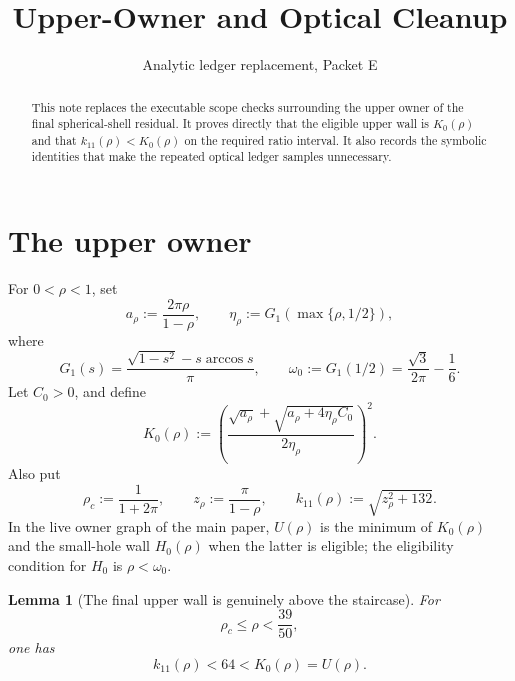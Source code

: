 \documentclass[11pt]{article}
\title{Upper-Owner and Optical Cleanup}
\author{}
\date{Analytic ledger replacement, Packet E}
\newtheorem{lemma}{Lemma}
\begin{document}
\maketitle

\begin{abstract}
This note replaces the executable scope checks surrounding the upper owner
of the final spherical-shell residual. It proves directly that the eligible
upper wall is \(K_0(\rho)\) and that
\(k_{11}(\rho)<K_0(\rho)\) on the required ratio interval. It also records
the symbolic identities that make the repeated optical ledger samples
unnecessary.
\end{abstract}

\section{The upper owner}

For \(0<\rho<1\), set
\[
 a_\rho:=\frac{2\pi\rho}{1-\rho},
 \qquad
 \eta_\rho:=G_1\!\left(\max\{\rho,1/2\}\right),
\]
where
\[
 G_1(s)=\frac{\sqrt{1-s^2}-s\arccos s}{\pi},
 \qquad
 \omega_0:=G_1(1/2)=\frac{\sqrt3}{2\pi}-\frac16.
\]
Let \(C_0>0\), and define
\begin{equation}
 K_0(\rho):=
 \left(
  \frac{\sqrt{a_\rho}+\sqrt{a_\rho+4\eta_\rho C_0}}
       {2\eta_\rho}
 \right)^2.
 \label{eq:K0}
\end{equation}
Also put
\[
 \rho_c:=\frac1{1+2\pi},
 \qquad z_\rho:=\frac\pi{1-\rho},
 \qquad k_{11}(\rho):=\sqrt{z_\rho^2+132}.
\]
In the live owner graph of the main paper, \(U(\rho)\) is the minimum of
\(K_0(\rho)\) and the small-hole wall \(H_0(\rho)\) when the latter is
eligible; the eligibility condition for \(H_0\) is \(\rho<\omega_0\).

\begin{lemma}[The final upper wall is genuinely above the staircase]
\label{lem:k11-K0}
For
\[
       \rho_c\leq\rho<\frac{39}{50},
\]
one has
\begin{equation}
       k_{11}(\rho)<64<K_0(\rho)=U(\rho).
       \label{eq:k11-K0}
\end{equation}
\end{lemma}
\end{document}
